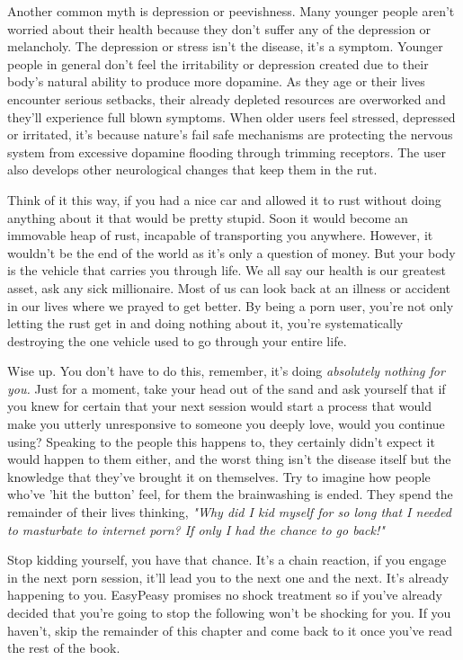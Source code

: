 \documentclass[easypeasy.tex]{subfiles}
\begin{document}
Another common myth is depression or peevishness. Many younger people aren't worried about their health because they don't suffer any of the depression or melancholy. The depression or stress isn't the disease, it's a symptom. Younger people in general don't feel the irritability or depression created due to their body's natural ability to produce more dopamine. As they age or their lives encounter serious setbacks, their already depleted resources are overworked and they'll experience full blown symptoms. When older users feel stressed, depressed or irritated, it's because nature's fail safe mechanisms are protecting the nervous system from excessive dopamine flooding through trimming receptors. The user also develops other neurological changes that keep them in the rut.

Think of it this way, if you had a nice car and allowed it to rust without doing anything about it that would be pretty stupid. Soon it would become an immovable heap of rust, incapable of transporting you anywhere. However, it wouldn't be the end of the world as it's only a question of money. But your body is the vehicle that carries you through life. We all say our health is our greatest asset, ask any sick millionaire. Most of us can look back at an illness or accident in our lives where we prayed to get better. By being a porn user, you're not only letting the rust get in and doing nothing about it, you're systematically destroying the one vehicle used to go through your entire life.

Wise up. You don't have to do this, remember, it's doing \textit{absolutely nothing for you.} Just for a moment, take your head out of the sand and ask yourself that if you knew for certain that your next session would start a process that would make you utterly unresponsive to someone you deeply love, would you continue using? Speaking to the people this happens to, they certainly didn't expect it would happen to them either, and the worst thing isn't the disease itself but the knowledge that they've brought it on themselves. Try to imagine how people who've 'hit the button' feel, for them the brainwashing is ended. They spend the remainder of their lives thinking, \textit{"Why did I kid myself for so long that I needed to masturbate to internet porn? If only I had the chance to go back!"}

Stop kidding yourself, you have that chance. It's a chain reaction, if you engage in the next porn session, it'll lead you to the next one and the next. It's already happening to you. EasyPeasy promises no shock treatment so if you've already decided that you're going to stop the following won't be shocking for you. If you haven't, skip the remainder of this chapter and come back to it once you've read the rest of the book.
\end{document}
